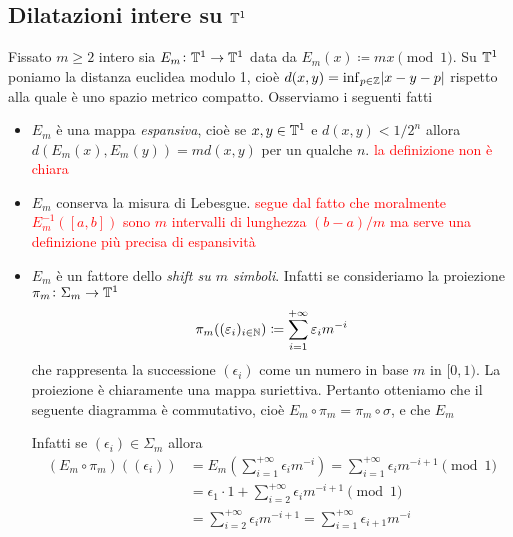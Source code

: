 \subsection{Dilatazioni intere su $ \mathbb{T}^1 $}
Fissato $ m \geq 2 $ intero sia $ E_m \colon \mathbb{T}^1 \to \mathbb{T}^1 $ data da $ E_m(x) \coloneqq mx \pmod{1} $. Su $ \mathbb{T}^1 $ poniamo la distanza euclidea modulo 1, cioè $ d(x, y) = \inf_{p \in \mathbb{Z}} \abs{x - y - p} $ rispetto alla quale è uno spazio metrico compatto. Osserviamo i seguenti fatti
\begin{itemize}
	\item $ E_m $ è una mappa \emph{espansiva}, cioè se $ x, y \in \mathbb{T}^1 $ e $ d(x, y) < 1/2^n $ allora $ d(E_m(x), E_m(y)) = m d(x, y) $ per un qualche $ n $. \textcolor{red}{la definizione non è chiara}
	\item $ E_m $ conserva la misura di Lebesgue. \textcolor{red}{segue dal fatto che moralmente $ E_m^{-1}([a, b]) $ sono $ m $ intervalli di lunghezza $ (b - a)/m $ ma serve una definizione più precisa di espansività}
	\item $ E_m $ è un fattore dello \emph{shift su $ m $ simboli}. Infatti se consideriamo la proiezione $ \pi_m \colon \Sigma_m \to \mathbb{T}^1 $ 
    \[
        \pi_m((\varepsilon_i)_{i \in \mathbb{N}}) \coloneqq \sum_{i = 1}^{+\infty} \varepsilon_i m^{-i}
    \]
    che rappresenta la successione $ (\epsilon_i) $ come un numero in base $ m $ in $ [0, 1) $. La proiezione è chiaramente una mappa suriettiva. Pertanto otteniamo che il seguente diagramma è commutativo, cioè $ E_m \circ \pi_m = \pi_m \circ \sigma $, e che $ E_m $ 
    \begin{center}
    \end{center}
    Infatti se $ (\epsilon_i) \in \Sigma_m $ allora 
    \begin{align*}
        (E_m \circ \pi_m)((\epsilon_i)) & = E_m\left(\sum_{i = 1}^{+\infty} \epsilon_i m^{-i}\right)  = \sum_{i = 1}^{+\infty} \epsilon_i m^{-i+1} \pmod{1} \\
        & = \epsilon_1 \cdot 1 + \sum_{i = 2}^{+\infty} \epsilon_i m^{-i+1} \pmod{1} \\
        & = \sum_{i = 2}^{+\infty} \epsilon_i m^{-i+1} = \sum_{i = 1}^{+\infty} \epsilon_{i + 1} m^{-i}
    \end{align*}

\end{itemize}
